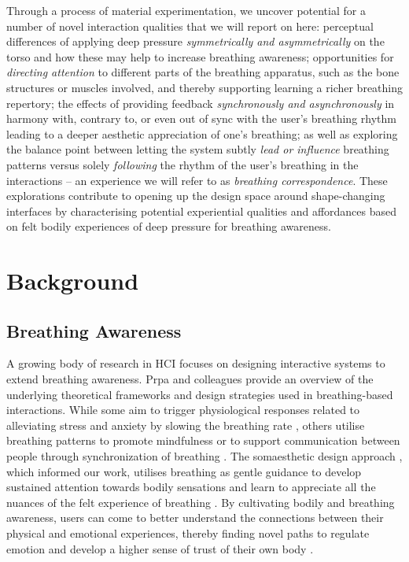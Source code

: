 Through a process of material experimentation, we uncover potential for a number of novel interaction qualities that we will report on here: perceptual differences of applying deep pressure \textit{symmetrically and asymmetrically} on the torso and how these may help to increase breathing awareness; opportunities for \textit{directing attention} to different parts of the breathing apparatus, such as the bone structures or muscles involved, and thereby supporting learning a richer breathing repertory; the effects of providing feedback \textit{synchronously and asynchronously} in harmony with, contrary to, or even out of sync with the user's breathing rhythm leading to a deeper aesthetic appreciation of one's breathing; as well as exploring the balance point between letting the system subtly \textit{lead or influence} breathing patterns versus solely \textit{following} the rhythm of the user's breathing in the interactions -- an experience we will refer to as \textit{breathing correspondence}. These explorations contribute to opening up the design space around shape-changing interfaces by characterising potential experiential qualities and affordances based on felt bodily experiences of deep pressure for breathing awareness. 


\section{Background}

\subsection{Breathing Awareness}

A growing body of research in HCI focuses on designing interactive systems to extend breathing awareness. Prpa and colleagues \cite{prpa_inhaling_2020} provide an overview of the underlying theoretical frameworks and design strategies used in breathing-based interactions. While some aim to trigger physiological responses related to alleviating stress and anxiety by slowing the breathing rate \cite{van_rooij_deep_2016, bumatay_investigating_2017, parnandi_chill-out_2014}, others utilise breathing patterns to promote mindfulness \cite{pisa_towards_2017, shamekhi_breathe_2018} or to support communication between people through synchronization of breathing \cite{desnoyers-stewart_jel_2019,kim_breathingframe_2015}. The somaesthetic design approach \cite{hook_designing_2018}, which informed our work, utilises breathing as gentle guidance to develop sustained attention towards bodily sensations and learn to appreciate all the nuances of the felt experience of breathing \cite{prpa_attending_2018, stahl_soma_2016}. By cultivating bodily and breathing awareness, users can come to better understand the connections between their physical and emotional experiences, thereby finding novel paths to regulate emotion and develop a higher sense of trust of their own body \cite{bornemann_differential_2015}.

